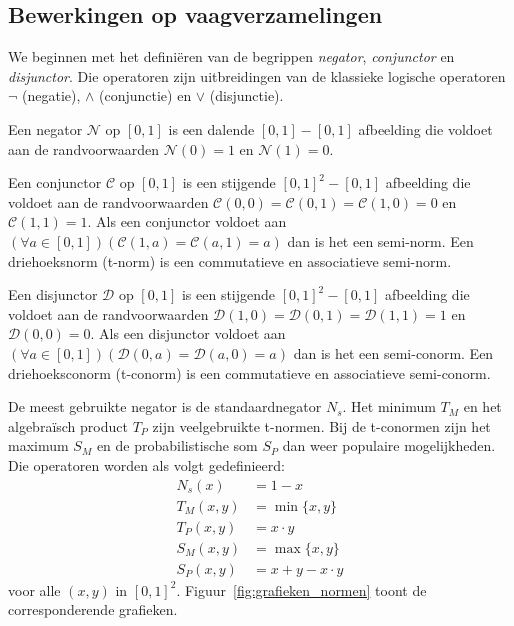 \subsection{Bewerkingen op vaagverzamelingen}
\label{sectie:bew_op_vaagverz}

We beginnen met het defini\"eren van de begrippen \emph{negator}, \emph{conjunctor} en 
\emph{disjunctor}. Die operatoren zijn uitbreidingen van de klassieke logische operatoren
$\lnot$ (negatie), $\land$ (conjunctie) en $\lor$ (disjunctie).
\begin{definitie}
Een negator $\mathcal{N}$ op $[0,1]$ is een dalende $[0,1] - [0,1]$ afbeelding die voldoet
aan de randvoorwaarden $\mathcal{N}(0)=1$ en $\mathcal{N}(1)=0$. 
\end{definitie}
\begin{definitie}
Een conjunctor $\mathcal{C}$ op $[0,1]$ is een stijgende $[0,1]^2 - [0,1]$ afbeelding die voldoet aan de
randvoorwaarden $\mathcal{C}(0,0)=\mathcal{C}(0,1)=\mathcal{C}(1,0)=0$ en $\mathcal{C}(1,1)=1$. 
Als een conjunctor voldoet aan 
$(\forall a \in [0,1])(\mathcal{C}(1,a)=\mathcal{C}(a,1)=a)$ dan is het een semi-norm.
Een driehoeksnorm (t-norm) is een commutatieve en associatieve semi-norm.
\end{definitie}
\begin{definitie}
Een disjunctor $\mathcal{D}$ op $[0,1]$ is een stijgende $[0,1]^2 - [0,1]$ afbeelding die voldoet
aan de randvoorwaarden $\mathcal{D}(1,0)=\mathcal{D}(0,1)=\mathcal{D}(1,1)=1$ en 
$\mathcal{D}(0,0)=0$. Als een disjunctor voldoet aan 
$(\forall a \in [0,1])(\mathcal{D}(0,a)=\mathcal{D}(a,0)=a)$ dan is het een semi-conorm.
Een driehoeksconorm (t-conorm) is een commutatieve en associatieve semi-conorm.
\end{definitie}

De meest gebruikte negator is de standaardnegator $N_s$. Het minimum $T_M$ en het algebra\"isch 
product $T_P$ zijn veelgebruikte t-normen. Bij de t-conormen zijn het maximum $S_M$ en de
probabilistische som $S_P$ dan weer populaire mogelijkheden. Die operatoren worden als 
volgt gedefinieerd:
\begin{align*}
N_s(x) &= 1 - x \\
T_M(x,y) &= \min \{x,y\} \\
T_P(x,y) &= x \cdot y \\
S_M(x,y) &= \max \{x,y\} \\
S_P(x,y) &= x + y - x \cdot y
\end{align*}
voor alle $(x,y)$ in $[0,1]^2$. Figuur~\ref{fig:grafieken_normen} toont de corresponderende
grafieken.

